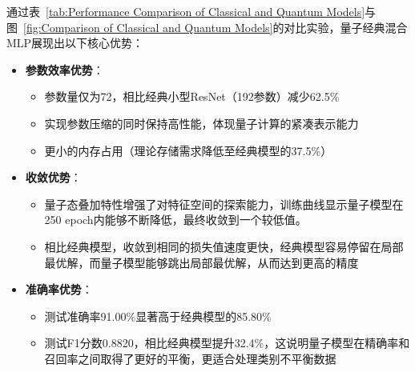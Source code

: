 \documentclass[10pt,a4paper,twoside]{article}
\numberwithin{figure}{section}%
\numberwithin{table}{section}%
\begin{document}

通过表~\ref{tab:Performance Comparison of Classical and Quantum Models}与图~\ref{fig:Comparison of Classical and Quantum Models}的对比实验，量子经典混合MLP展现出以下核心优势：

\begin{itemize}
    \item \textbf{参数效率优势}：
    \begin{itemize}
        \item 参数量仅为72，相比经典小型ResNet（192参数）减少62.5\%
        \item 实现参数压缩的同时保持高性能，体现量子计算的紧凑表示能力
        \item 更小的内存占用（理论存储需求降低至经典模型的37.5\%）
    \end{itemize}
    
    \item \textbf{收敛优势}：
    \begin{itemize}
        \item 量子态叠加特性增强了对特征空间的探索能力，训练曲线显示量子模型在250 epoch内能够不断降低，最终收敛到一个较低值。
        \item 相比经典模型，收敛到相同的损失值速度更快，经典模型容易停留在局部最优解，而量子模型能够跳出局部最优解，从而达到更高的精度
    \end{itemize}
    
    \item \textbf{准确率优势}：
    \begin{itemize}
        \item 测试准确率91.00\%显著高于经典模型的85.80\%
        \item 测试F1分数0.8820，相比经典模型提升32.4\%，这说明量子模型在精确率和召回率之间取得了更好的平衡，更适合处理类别不平衡数据
    \end{itemize}
    
\end{itemize}
\end{document}
